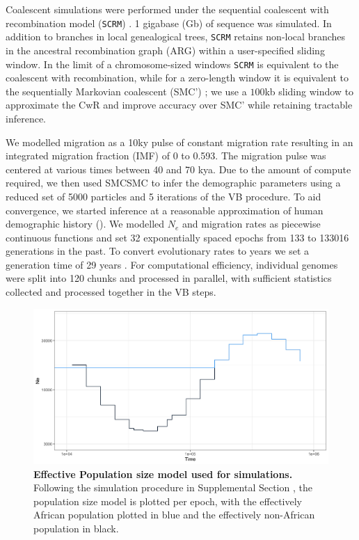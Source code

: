 Coalescent simulations were performed under the sequential coalescent with recombination model ({\tt SCRM}) \cite{Staab2015}. 1 gigabase (Gb) of sequence was simulated.  In addition to branches in local genealogical trees, {\tt SCRM} retains non-local branches in the ancestral recombination graph (ARG) within a user-specified sliding window.  In the limit of a chromosome-sized windows {\tt SCRM} is equivalent to the coalescent with recombination, while for a zero-length window it is equivalent to the sequentially Markovian coalescent (SMC') \cite{McVean2005,Marjoram2006}; we use a $100$kb sliding window to approximate the CwR and improve accuracy over SMC' while retaining tractable inference.

We modelled migration as a 10ky pulse of constant migration rate resulting in an integrated migration fraction (IMF) of 0 to 0.593. The migration pulse was centered at various times between 40 and 70 kya.  Due to the amount of compute required, we then used SMCSMC to infer the demographic parameters using a reduced set of 5000 particles and 5 iterations of the VB procedure. To aid convergence, we started inference at a reasonable approximation of human demographic history (). We modelled $N_e$ and migration rates as piecewise continuous functions and set 32 exponentially spaced epochs from 133 to 133016 generations in the past. To convert evolutionary rates to years we set a generation time of 29 years \cite{Fenner2005}.  For computational efficiency, individual genomes were split into 120 chunks and processed in parallel, with sufficient statistics collected and processed together in the VB steps.


\begin{figure}[hb]
  \centering
  \includegraphics[width = 0.5\linewidth]{plot/demographic_model.png}
  \caption{{\bf Effective Population size model used for simulations.} Following the simulation procedure in Supplemental Section , the population size model is plotted per epoch, with the effectively African population plotted in blue and the effectively non-African population in black. }
  \label{fig:dem}
\end{figure}

